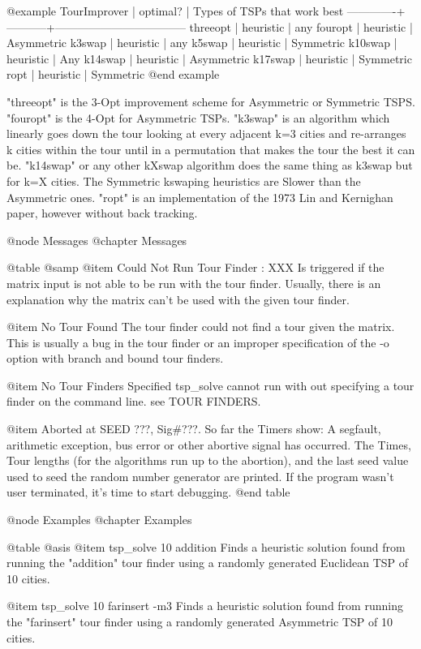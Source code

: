 @example
TourImprover |  optimal? | Types of TSPs that work best
-------------+-----------+-----------------------------------
threeopt     | heuristic | any
fouropt      | heuristic | Asymmetric
k3swap       | heuristic | any
k5swap       | heuristic | Symmetric
k10swap      | heuristic | Any
k14swap      | heuristic | Asymmetric
k17swap      | heuristic | Symmetric
ropt         | heuristic | Symmetric
@end example

"threeopt" is the 3-Opt improvement scheme for Asymmetric or Symmetric TSPS.
"fouropt" is the 4-Opt for Asymmetric TSPs.  "k3swap" is an algorithm which
linearly goes down the tour looking at every adjacent k=3 cities and
re-arranges k cities within the tour until in a permutation that makes the
tour the best it can be.  "k14swap" or any other kXswap algorithm does the
same thing as k3swap but for k=X cities.  The Symmetric kswaping heuristics
are Slower than the Asymmetric ones. "ropt" is an implementation of the 1973
Lin and Kernighan paper, however without back tracking.

@node Messages
@chapter Messages

@table @samp
@item Could Not Run Tour Finder : XXX
Is triggered if the matrix input is not able to be run with the tour finder.
Usually, there is an explanation why the matrix can't be used with the given
tour finder.

@item No Tour Found
The tour finder could not find a tour given the matrix.  This is usually a bug
in the tour finder or an improper specification of the -o option with branch
and bound tour finders.

@item No Tour Finders Specified
tsp_solve cannot run with out specifying a tour finder on the command line.
see TOUR FINDERS.

@item Aborted at SEED ???, Sig#???.  So far the Timers show:
A segfault, arithmetic exception, bus error or other abortive signal has
occurred.  The Times, Tour lengths (for the algorithms run up to the
abortion), and the last seed value used to seed the random number generator
are printed.  If the program wasn't user terminated, it's time to start
debugging.
@end table

@node Examples
@chapter Examples

@table @asis
@item tsp_solve 10 addition
Finds a heuristic solution found from running the "addition" tour finder
using a randomly generated Euclidean TSP of 10 cities.

@item tsp_solve 10 farinsert -m3
Finds a heuristic solution found from running the "farinsert" tour finder
using a randomly generated Asymmetric TSP of 10 cities.


